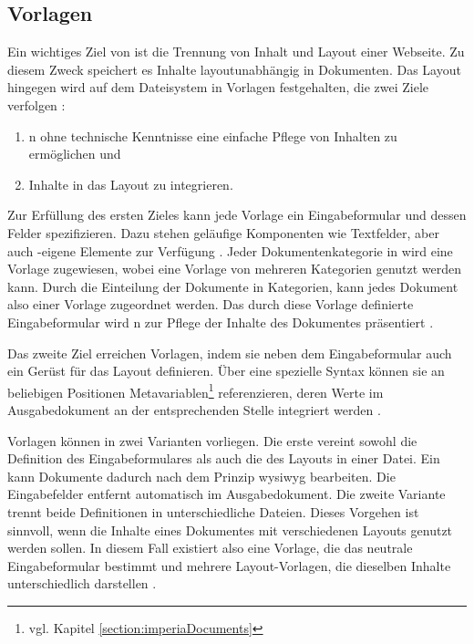     \subsection{Vorlagen}
        \label{section:imperiaTemplates}
        Ein wichtiges Ziel von {\imperia} ist die Trennung von Inhalt
        und Layout einer Webseite.
        Zu diesem Zweck speichert es Inhalte layoutunabhängig
        in Dokumenten.
        Das Layout hingegen wird auf dem Dateisystem in Vorlagen festgehalten,
        die zwei Ziele verfolgen
        \cite[Kapitel 36]{imperia:ecmd}:

        \begin{enumerate}
            \item {\editors}n ohne technische Kenntnisse eine einfache Pflege von Inhalten zu ermöglichen und
            \item Inhalte in das Layout zu integrieren.
        \end{enumerate}

        Zur Erfüllung des ersten Zieles kann jede Vorlage ein Eingabeformular
        und dessen Felder spezifizieren.
        Dazu stehen geläufige Komponenten wie Textfelder,
        aber auch {\imperia}-eigene Elemente zur Verfügung
        \cite[Kapitel 1.1.4]{imperia:ecmd}.
        Jeder Dokumentenkategorie in {\imperia} wird eine Vorlage zugewiesen,
        wobei eine Vorlage von mehreren Kategorien genutzt werden kann.
        Durch die Einteilung der Dokumente in Kategorien,
        kann jedes Dokument also einer Vorlage zugeordnet werden.
        Das durch diese Vorlage definierte Eingabeformular
        wird {\editors n} zur Pflege der Inhalte des Dokumentes präsentiert
        \cite[Kapitel 1.1.4]{imperia:ecmd}.

        Das zweite Ziel erreichen Vorlagen,
        indem sie neben dem Eingabeformular auch ein Gerüst für das
        Layout definieren.
        Über eine spezielle Syntax können sie an beliebigen Positionen
        Metavariablen\footnote{vgl. Kapitel \ref{section:imperiaDocuments}} referenzieren,
        deren Werte im Ausgabedokument an der entsprechenden Stelle integriert werden
        \cite[Kapitel 36]{imperia:ecmd}.

        Vorlagen können in zwei Varianten vorliegen.
        Die erste vereint sowohl die Definition des Eingabeformulares
        als auch die des Layouts in einer Datei.
        Ein {\editor} kann Dokumente dadurch nach dem Prinzip \gls{wysiwyg} bearbeiten.
        Die Eingabefelder entfernt {\imperia} automatisch im Ausgabedokument.
        Die zweite Variante trennt beide Definitionen in unterschiedliche Dateien.
        Dieses Vorgehen ist sinnvoll, wenn die Inhalte eines Dokumentes mit
        verschiedenen Layouts genutzt werden sollen.
        In diesem Fall existiert also eine Vorlage,
        die das neutrale Eingabeformular bestimmt
        und mehrere Layout-Vorlagen, die dieselben Inhalte unterschiedlich darstellen
        \cite[Kapitel 36]{imperia:ecmd}.

